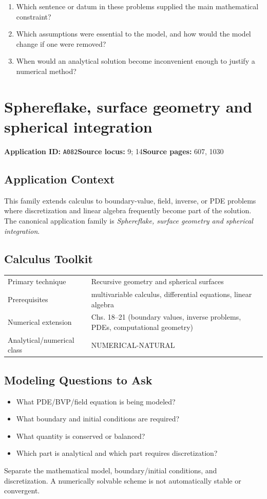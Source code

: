 \documentclass[11pt]{book}
\newcommand{\pid}[1]{\texttt{#1}}
\begin{document}
\begin{reflectionbox}\begin{enumerate}
\item Which sentence or datum in these problems supplied the main mathematical constraint?
\item Which assumptions were essential to the model, and how would the model change if one were removed?
\item When would an analytical solution become inconvenient enough to justify a numerical method?
\end{enumerate}\end{reflectionbox}
\chapter{Sphereflake, surface geometry and spherical integration}\label{app:A082}
\textbf{Application ID:} \pid{A082}\quad \textbf{Source locus:} 9; 14\quad \textbf{Source pages:} 607, 1030
\section*{Application Context}
This family extends calculus to boundary-value, field, inverse, or PDE problems where discretization and linear algebra frequently become part of the solution. The canonical application family is \emph{Sphereflake, surface geometry and spherical integration}.
\section*{Calculus Toolkit}
\begin{tabularx}{\textwidth}{@{}lX@{}}\toprule
Primary technique & Recursive geometry and spherical surfaces \\
Prerequisites & multivariable calculus, differential equations, linear algebra \\
Numerical extension & Chs. 18–21 (boundary values, inverse problems, PDEs, computational geometry) \\
Analytical/numerical class & NUMERICAL-NATURAL \\
\bottomrule\end{tabularx}
\section*{Modeling Questions to Ask}\begin{itemize}
\item What PDE/BVP/field equation is being modeled?
\item What boundary and initial conditions are required?
\item What quantity is conserved or balanced?
\item Which part is analytical and which part requires discretization?
\end{itemize}
\begin{errorbox}Separate the mathematical model, boundary/initial conditions, and discretization. A numerically solvable scheme is not automatically stable or convergent.\end{errorbox}
\end{document}
